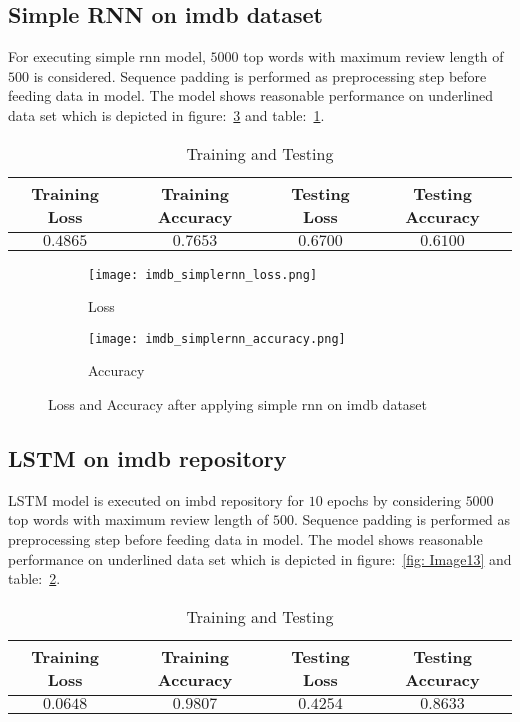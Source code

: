 \documentclass[12pt,a4paper,titlepage]{report}
\begin{document}
\subsection{Simple RNN on imdb dataset}
For executing simple rnn model, $5000$ top words with maximum review length of $500$ is considered. Sequence padding is performed as preprocessing step before feeding data in model. The model shows reasonable performance on underlined data set which is depicted in figure:~\ref{fig: Image12} and table:~\ref{tab: Table-23}.
\vspace{20pt}
\begin{table}[H]
\centering
\caption{Training and Testing}
\label{tab: Table-23}
\begin{tabular}{c c c c}
\hline
\textbf{Training Loss} & \textbf{Training Accuracy} & \textbf{Testing Loss} & \textbf{Testing Accuracy}\\
\hline
$0.4865$ & $0.7653$ & $0.6700$ & $0.6100$\\
\hline
\end{tabular}
\end{table}

\begin{figure}[H]
\centering
\begin{subfigure}[h]{0.45\linewidth}
\texttt{[image: imdb\_simplernn\_loss.png]}
\caption{Loss}
\label{fig:a}
\end{subfigure}
\quad
\begin{subfigure}[h]{0.45\linewidth}
\texttt{[image: imdb\_simplernn\_accuracy.png]}
\caption{Accuracy}
\label{fig:b}
\end{subfigure}
\caption{Loss and Accuracy after applying simple rnn on imdb dataset}
\label{fig: Image12}
\end{figure}

\subsection{LSTM on imdb repository}
LSTM model is executed on imbd repository for $10$ epochs by considering $5000$ top words with maximum review length of $500$. Sequence padding is performed as preprocessing step before feeding data in model. The model shows reasonable performance on underlined data set which is depicted in figure:~\ref{fig: Image13} and table:~\ref{tab: Table-24}.
\vspace{20pt}
\begin{table}[H]
\centering
\caption{Training and Testing}
\label{tab: Table-24}
\begin{tabular}{c c c c}
\hline
\textbf{Training Loss} & \textbf{Training Accuracy} & \textbf{Testing Loss} & \textbf{Testing Accuracy}\\
\hline
$0.0648$ & $0.9807$ & $0.4254$ & $0.8633$\\
\hline
\end{tabular}
\end{table}
\end{document}
